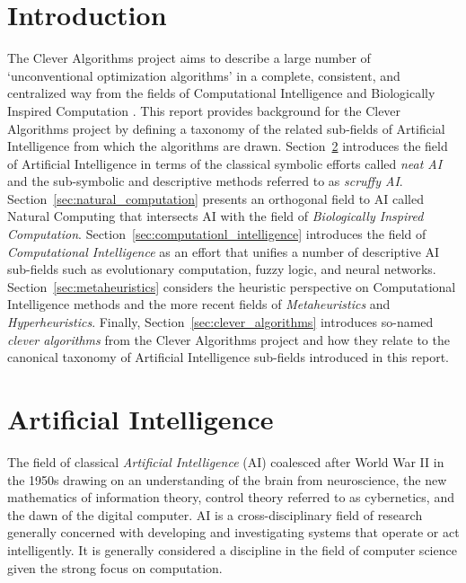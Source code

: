 \documentclass[a4paper, 11pt]{article}
\begin{document}
\section{Introduction}
\label{sec:introduction}
The Clever Algorithms project aims to describe a large number of `unconventional optimization algorithms' in a complete, consistent, and centralized way from the fields of Computational Intelligence and Biologically Inspired Computation \cite{Brownlee2010}.
This report provides background for the Clever Algorithms project by defining a taxonomy of the related sub-fields of Artificial Intelligence from which the algorithms are drawn.
Section~\ref{sec:artificial_intelligence} introduces the field of Artificial Intelligence in terms of the classical symbolic efforts called \emph{neat AI} and the sub-symbolic and descriptive methods referred to as \emph{scruffy AI}. Section~\ref{sec:natural_computation} presents an orthogonal field to AI called Natural Computing that intersects AI with the field of \emph{Biologically Inspired Computation}. Section~\ref{sec:computationl_intelligence} introduces the field of \emph{Computational Intelligence} as an effort that unifies a number of descriptive AI sub-fields such as evolutionary computation, fuzzy logic, and neural networks. Section~\ref{sec:metaheuristics} considers the heuristic perspective on Computational Intelligence methods and the more recent fields of \emph{Metaheuristics} and \emph{Hyperheuristics}. Finally, Section~\ref{sec:clever_algorithms} introduces so-named \emph{clever algorithms} from the Clever Algorithms project and how they relate to the canonical taxonomy of Artificial Intelligence sub-fields introduced in this report.

% 
% 
\section{Artificial Intelligence}
\label{sec:artificial_intelligence}
The field of classical \emph{Artificial Intelligence} (AI) coalesced after World War II in the 1950s drawing on an understanding of the brain from neuroscience, the new mathematics of information theory, control theory referred to as cybernetics, and the dawn of the digital computer. AI is a cross-disciplinary field of research generally concerned with developing and investigating systems that operate or act intelligently. It is generally considered a discipline in the field of computer science given the strong focus on computation.
\end{document}
